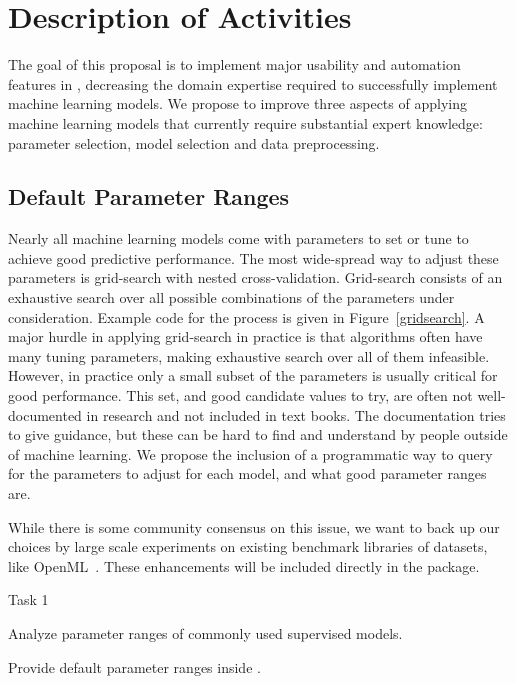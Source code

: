 \section{Description of Activities}
\enlargethispage{\baselineskip}
The goal of this proposal is to implement major usability and automation
features in \sklearn{}, decreasing the domain expertise required to
successfully implement machine learning models.  We propose to improve three
aspects of applying machine learning models that currently require substantial
expert knowledge: parameter selection, model selection and data preprocessing.

\subsection{Default Parameter Ranges}
Nearly all machine learning models come with parameters to set or tune
to achieve good predictive performance. The most wide-spread way to adjust
these parameters is grid-search with nested cross-validation.
Grid-search consists of an exhaustive search over all possible combinations
of the parameters under consideration. Example code for the process is given
in Figure~\ref{gridsearch}.
A major hurdle in applying grid-search in practice is that algorithms
often have many tuning parameters, making exhaustive search
over all of them infeasible. However, in practice only a small subset
of the parameters is usually critical for good performance. This set,
and good candidate values to try, are often not well-documented in research and
not included in text books.
The \sklearn{} documentation tries to give guidance, but these can be hard
to find and understand by people outside of machine learning.
We propose the inclusion of a programmatic way to query for the parameters
to adjust for each model, and what good parameter ranges are.

While there is some community consensus on this issue, we want to back
up our choices by large scale experiments on existing benchmark libraries
of datasets, like OpenML~\autocite{van2013openml}. These enhancements will
be included directly in the \sklearn{} package.
\begin{labeling}{Task 1}
    \itemsep-4pt
    \item [Task 1] Analyze parameter ranges of commonly used supervised models.
    \item [Task 2] Provide default parameter ranges inside \sklearn{}.
\end{labeling}

